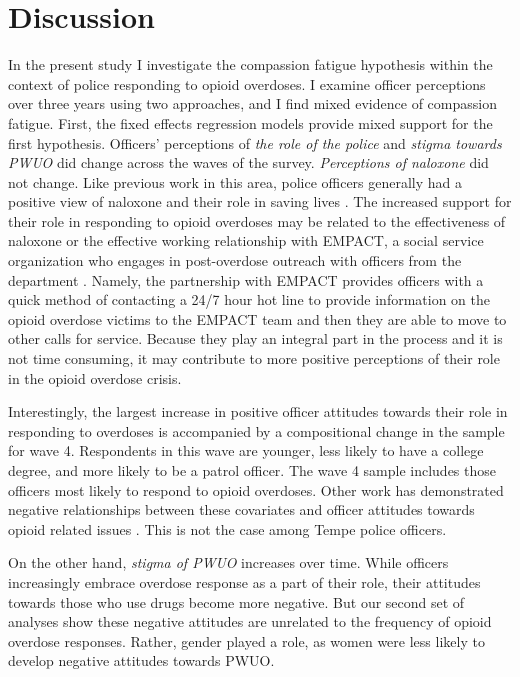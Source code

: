 \section{\centering Discussion}

In the present study I investigate the compassion fatigue hypothesis within the context of police responding to opioid overdoses. I examine officer perceptions over three years using two approaches, and I find mixed evidence of compassion fatigue. First, the fixed effects regression models provide mixed support for the first hypothesis. Officers' perceptions of \textit{the role of the police} and \textit{stigma towards PWUO} did change across the waves of the survey. \textit{Perceptions of naloxone} did not change. Like previous work in this area, police officers generally had a positive view of naloxone and their role in saving lives \parencite{white_narcan_2021, pourtaher_naloxone_2022, reichert_police_2023}. The increased support for their role in responding to opioid overdoses may be related to the effectiveness of naloxone \parencite{white_leveraging_2022} or the effective working relationship with EMPACT, a social service organization who engages in post-overdose outreach with officers from the department \parencite{white_moving_2021}. Namely, the partnership with EMPACT provides officers with a quick method of contacting a 24/7 hour hot line to provide information on the opioid overdose victims to the EMPACT team and then they are able to move to other calls for service. Because they play an integral part in the process and it is not time consuming, it may contribute to more positive perceptions of their role in the opioid overdose crisis.

Interestingly, the largest increase in positive officer attitudes towards their role in responding to overdoses is accompanied by a compositional change in the sample for wave 4. Respondents in this wave are younger, less likely to have a college degree, and more likely to be a patrol officer. The wave 4 sample includes those officers most likely to respond to opioid overdoses. Other work has demonstrated negative relationships between these covariates and officer attitudes towards opioid related issues \parencite{kruis_police_2020, reichert_police_2023}. This is not the case among Tempe police officers.

On the other hand, \textit{stigma of PWUO} increases over time. While officers increasingly embrace overdose response as a part of their role, their attitudes towards those who use drugs become more negative. But our second set of analyses show these negative attitudes are unrelated to the frequency of opioid overdose responses.  Rather, gender played a role, as women were less likely to develop negative attitudes towards PWUO. 

